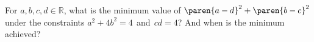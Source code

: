 For $a, b, c, d \in \mathbb{R}$,
what is the minimum value of $\paren{a - d}^2 + \paren{b - c}^2$
under the constraints $a^2 + 4b^2 = 4 \mspace{2mu}$ and $ \mspace{2mu} cd = 4$?
And when is the minimum achieved?
